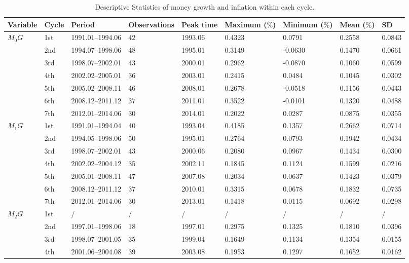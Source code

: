 \documentclass[a4paper,fleqn]{cas-sc}
\begin{document}
\begin{table}
    \caption{Descriptive Statistics of money growth and inflation within each cycle.}\label{tbl1}
	\begin{tabular*}{\tblwidth}{@{}LLLLLLLLL@{}}
	    \toprule
	    Variable & Cycle & Period & Observations & Peak time & Maximum ($\%$) & Minimum ($\%$) & Mean ($\%$) & SD \\ %
	    \midrule
	    $M_0G$ & 1st & 1991.01–1994.06 & 42 & 1993.06 & 0.4323 & 0.0791 & 0.2558 & 0.0843 \\
		   & 2nd & 1994.07–1998.06 & 48 & 1995.01 & 0.3149 & -0.0630 & 0.1470 & 0.0661 \\
		   & 3rd & 1998.07–2002.01 & 43 & 2000.01 & 0.2962 & -0.0870 & 0.1060 & 0.0599 \\
		   & 4th & 2002.02–2005.01 & 36 & 2003.01 & 0.2415 & 0.0484 & 0.1045 & 0.0302 \\
		   & 5th &2005.02–2008.11 & 46 & 2008.01 & 0.2678 & -0.0518 & 0.1156 & 0.0443 \\
		   & 6th & 2008.12–2011.12 & 37 & 2011.01 & 0.3522 & -0.0101 & 0.1320 & 0.0488 \\
		   & 7th & 2012.01–2014.06 & 30 & 2014.01 & 0.2022 & 0.0287 & 0.0875 & 0.0355 \\
	    $M_1G$ & 1st & 1991.01–1994.04 & 40 & 1993.04 & 0.4185 & 0.1357 & 0.2662 & 0.0714 \\
		   & 2nd & 1994.05–1998.06 & 50 & 1995.01 & 0.2764 & 0.0793 & 0.1942 & 0.0434 \\
		   & 3rd & 1998.07–2002.01 & 43 & 2000.06 & 0.2080 & 0.0967 & 0.1434 & 0.0300 \\
		   & 4th & 2002.02–2004.12 & 35 & 2002.11 & 0.1845 & 0.1124 & 0.1599 & 0.0216 \\
		   & 5th & 2005.01–2008.11 & 47 & 2007.08 & 0.2034 & 0.0637 & 0.1423 & 0.0379 \\
		   & 6th & 2008.12–2011.12 & 37 & 2010.01 & 0.3315 & 0.0678 & 0.1832 & 0.0735 \\
		   & 7th & 2012.01–2014.06 & 30 & 2013.01 & 0.1418 & 0.0115 & 0.0692 & 0.0298 \\
	    $M_2G$ & 1st &/&/&/&/&/&/&/ \\
		   & 2nd & 1997.01–1998.06 & 18 & 1997.01 & 0.2975 & 0.1325 & 0.1810 & 0.0396 \\
		   & 3rd & 1998.07–2001.05 & 35 & 1999.04 & 0.1649 & 0.1134 & 0.1354 & 0.0155 \\
		   & 4th & 2001.06–2004.08 & 39 & 2003.08 & 0.1953 & 0.1297 & 0.1652 & 0.0162 \\

\end{tabular*}
\end{table}
\end{document}

